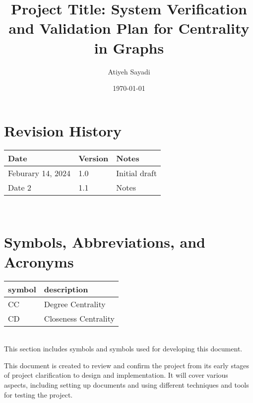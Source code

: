 \documentclass[12pt, titlepage]{article}
\begin{document}
\title{Project Title: System Verification and Validation Plan for Centrality in Graphs{}} 
\author{Atiyeh Sayadi}
\date{\today}
	
\maketitle


\section*{Revision History}

\begin{tabularx}{\textwidth}{p{3cm}p{2cm}X}
\toprule {\bf Date} & {\bf Version} & {\bf Notes}\\
\midrule
Feburary 14,  2024 & 1.0 & Initial draft\\
Date 2 & 1.1 & Notes\\
\bottomrule
\end{tabularx}

~\\


\newpage

\tableofcontents

\listoftables
{}

\listoffigures
{}

\newpage

\section{Symbols, Abbreviations, and Acronyms}

\renewcommand{\arraystretch}{1.2}
\begin{tabular}{l l} 
  \toprule		
  \textbf{symbol} & \textbf{description}\\
  \midrule 
  CC& Degree Centrality \\
  CD& Closeness Centrality  \\
  \bottomrule
\end{tabular}\\

This section includes symbols and symbols used for developing this document.


\newpage



This document is created to review and confirm the project from its early stages of project clarification to design and implementation. It will cover various aspects, including setting up documents and using different techniques and tools for testing the project.
\end{document}
